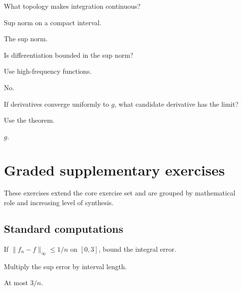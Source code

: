 \begin{exercise}\label{exr:ii12-06}
What topology makes integration continuous?
\end{exercise}
\begin{hint}
Sup norm on a compact interval.
\end{hint}
\begin{solution}
The sup norm.
\end{solution}

\begin{exercise}\label{exr:ii12-07}
Is differentiation bounded in the sup norm?
\end{exercise}
\begin{hint}
Use high-frequency functions.
\end{hint}
\begin{solution}
No.
\end{solution}

\begin{exercise}\label{exr:ii12-08}
If derivatives converge uniformly to $g$, what candidate derivative has the limit?
\end{exercise}
\begin{hint}
Use the theorem.
\end{hint}
\begin{solution}
$g$.
\end{solution}


\section{Graded supplementary exercises}
These exercises extend the core exercise set and are grouped by mathematical role and increasing level of synthesis.

\subsection*{Standard computations}

\begin{exercise}\label{exr:ii12-expand-01}
If \(\|f_n-f\|_\infty\le1/n\) on \([0,3]\), bound the integral error.
\end{exercise}
\begin{hint}
Multiply the sup error by interval length.
\end{hint}
\begin{solution}
At most \(3/n\).
\end{solution}

